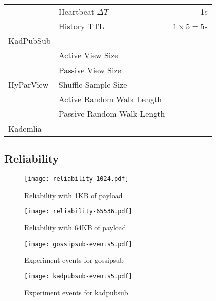 \documentclass[sigconf]{acmart}
\begin{document}
\begin{table}[]
{\begin{tabular}{|l|l|r|}
                               & Heartbeat $\Delta T$       & 1s                \\
                               & History TTL                & $1 \times 5 = 5$s \\ \hline
    KadPubSub                  &                            &                   \\ \hline
    \multirow{5}{*}{HyParView} & Active View Size           &                   \\
                               & Passive View Size          &                   \\
                               & Shuffle Sample Size        &                   \\
                               & Active Random Walk Length  &                   \\
                               & Passive Random Walk Length &                   \\ \hline
    Kademlia                   &                            &                   \\ \hline
    \end{tabular}%
    }
\end{table}

\subsection{Reliability}


\begin{figure}[htp]
    \centering
    \texttt{[image: reliability-1024.pdf]}
    \caption{Reliability with 1KB of payload}
    \label{fig:reliability-1024}
\end{figure}

\begin{figure}[htp]
    \centering
    \texttt{[image: reliability-65536.pdf]}
    \caption{Reliability with 64KB of payload}
    \label{fig:reliability-65536}
\end{figure}

\begin{figure}[htp]
    \centering
    \texttt{[image: gossipsub-events5.pdf]}
    \caption{Experiment events for gossipsub}
    \label{fig:gossipsub-events5}
\end{figure}

\begin{figure}[htp]
    \centering
    \texttt{[image: kadpubsub-events5.pdf]}
    \caption{Experiment events for kadpubsub}
    \label{fig:kadpubsub-events5}
\end{figure}
\end{document}
